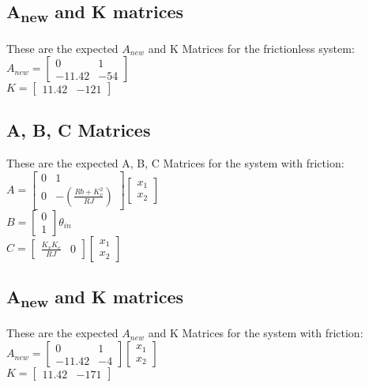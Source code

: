 \documentclass{homework}
\begin{document}
\subsection*{A\textsubscript{new} and K matrices}

These are the expected $A_{new}$ and K Matrices for the frictionless system:
\[\]
$A_{new} = \begin{bmatrix}
0 & 1\\
-11.42 & -54
\end{bmatrix}$
\\
$K = \begin{bmatrix}
11.42 & -121
\end{bmatrix}$
\subsection*{A, B, C Matrices}
These are the expected A, B, C Matrices for the system with friction:
\[\]
$A = \begin{bmatrix}
0 & 1\\
0 & -(\frac{Rb + K_v^2}{RJ})
\end{bmatrix}\begin{bmatrix}
x_1\\
x_2
\end{bmatrix}$
\\
$B = \begin{bmatrix}
0\\
1
\end{bmatrix}\theta_{in}$
\\
$C = \begin{bmatrix}
\frac{K_vK_c}{RJ} & 0
\end{bmatrix}\begin{bmatrix}
x_1\\
x_2
\end{bmatrix}
$

\subsection*{A\textsubscript{new} and K matrices}

These are the expected $A_{new}$ and K Matrices for the system with friction:
\[\]
$A_{new} = \begin{bmatrix}
0 & 1\\
-11.42 & -4
\end{bmatrix}\begin{bmatrix}
x_1\\
x_2
\end{bmatrix}$
\\
$K = \begin{bmatrix}
11.42 & -171
\end{bmatrix}$
\newpage
\end{document}

